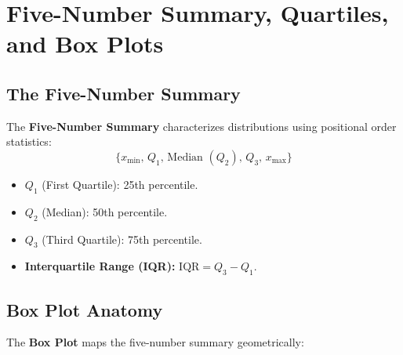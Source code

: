 \FloatBarrier
\section{Five-Number Summary, Quartiles, and Box Plots}

\subsection{The Five-Number Summary}
The \textbf{Five-Number Summary} characterizes distributions using positional order statistics:
\begin{equation}
    \Big\{x_{\min},\, Q_1,\, \text{Median } (Q_2),\, Q_3,\, x_{\max}\Big\}
\end{equation}
\begin{itemize}
    \item $Q_1$ (First Quartile): 25th percentile.
    \item $Q_2$ (Median): 50th percentile.
    \item $Q_3$ (Third Quartile): 75th percentile.
    \item \textbf{Interquartile Range (IQR):} $\text{IQR} = Q_3 - Q_1$.
\end{itemize}

\subsection{Box Plot Anatomy}
The \textbf{Box Plot} maps the five-number summary geometrically:

